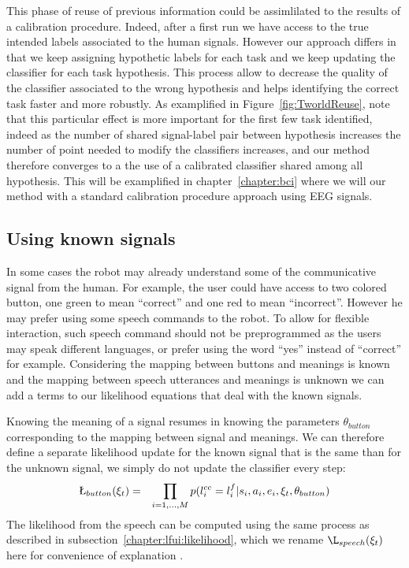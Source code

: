 This phase of reuse of previous information could be assimlilated to the results of a calibration procedure. Indeed, after a first run we have access to the true intended labels associated to the human signals. However our approach differs in that we keep assigning hypothetic labels for each task and we keep updating the classifier for each task hypothesis. This process allow to decrease the quality of the classifier associated to the wrong hypothesis and helps identifying the correct task faster and more robustly. As examplified in Figure~\ref{fig:TworldReuse}, note that this particular effect is more important for the first few task identified, indeed as the number of shared signal-label pair between hypothesis increases the number of point needed to modify the classifiers increases, and our method therefore converges to a the use of a calibrated classifier shared among all hypothesis. This will be examplified in chapter~\ref{chapter:bci} where we will our method with a standard calibration procedure approach using EEG signals.

\subsection{Using known signals}
\label{chapter:lfui:known}

In some cases the robot may already understand some of the communicative signal from the human. For example, the user could have access to two colored button, one green to mean ``correct'' and one red to mean ``incorrect''. However he may prefer using some speech commands to the robot. To allow for flexible interaction, such speech command should not be preprogrammed as the users may speak different languages, or prefer using the word ``yes'' instead of ``correct'' for example. Considering the mapping between buttons and meanings is known and the mapping between speech utterances and meanings is unknown we can add a terms to our likelihood equations that deal with the known signals. 

Knowing the meaning of a signal resumes in knowing the parameters $\theta_{button}$ corresponding to the mapping between signal and meanings. We can therefore define a separate likelihood update for the known signal that is the same than for the unknown signal, we simply do not update the classifier every step:
%
\begin{eqnarray}
\L_{button}(\xi_t) &=& \prod_{i = 1,\ldots, M} p(l^{cc}_i = l^f_i | s_i, a_i, e_i, \xi_t, \theta_{button})
\end{eqnarray}
%
The likelihood from the speech can be computed using the same process as described in subsection~\ref{chapter:lfui:likelihood}, which we rename $\L_{speech}(\xi_t)$ here for convenience of explanation .

